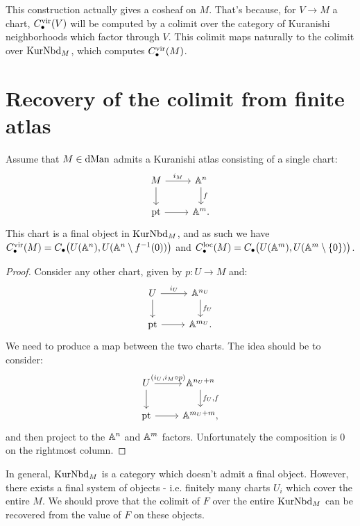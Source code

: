\begin{rem}
This construction actually gives a cosheaf on $M$. That's because, for $V \to M$ a chart, $C_{\bullet}^{\operatorname{vir}}(V)$ will be computed
by a colimit over the category of Kuranishi neighborhoods which factor through $V$. This colimit maps naturally to the
colimit over $\operatorname{KurNbd}_M$, which computes $C_{\bullet}^{\operatorname{vir}}(M)$.
\end{rem}


\section{Recovery of the colimit from finite atlas}
\begin{lem}
Assume that $M \in \operatorname{dMan}$ admits a Kuranishi atlas consisting of a single chart:
\[
\begin{tikzcd}
M\arrow{r}{i_M}\arrow{d} & \bbA^n\arrow{d}{f} \\ \pt \arrow{r} & \bbA^m .
\end{tikzcd}
\]
This chart is a final object in $\operatorname{KurNbd}_M$, and as such we have $C^{\operatorname{vir}}_{\bullet}(M) = C_{\bullet}\big(U(\mathbb A^n), 
U(\mathbb A^n \setminus f^{-1}(0)) \big)$ and $C^{\operatorname{loc}}_{\bullet}(M) = C_{\bullet}\big(U(\mathbb A^m), 
U(\mathbb A^m \setminus \{0\}) \big)$.
\end{lem}
\begin{proof}
Consider any other chart, given by $p: U \to M$ and:
\[
\begin{tikzcd}
U\arrow{r}{i_U}\arrow{d} & \bbA^{n_U}\arrow{d}{f_U} \\ \pt \arrow{r} & \bbA^{m_U} .
\end{tikzcd}
\]
We need to produce a map between the two charts. The idea should be to consider:
\[
\begin{tikzcd}
U\arrow{r}{(i_U,i_M \circ p)}\arrow{d} & \bbA^{n_U+n}\arrow{d}{f_U,f} \\ \pt \arrow{r} & \bbA^{m_U+m} ,
\end{tikzcd}
\]
and then project to the $\mathbb A^n$ and $\mathbb A^m$ factors. Unfortunately the composition is 0 on the rightmost column.
\end{proof}

In general, $\operatorname{KurNbd}_M$ is a category which doesn't admit a final object. However, there exists a final system of objects
 - i.e. finitely many charts $U_i$ which cover the entire $M$. We should prove that the colimit of $F$ over the entire $\operatorname{KurNbd}_M$
can be recovered from the value of $F$ on these objects.



